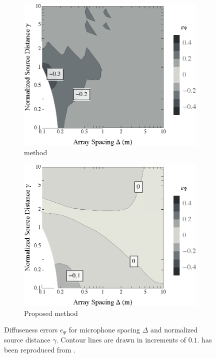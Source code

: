 \begin{figure}[t]
	\centering
	\begin{subfigure}[b]{0.49\textwidth}
		\includegraphics[width=\textwidth]{09_thiergart_comparison/figures/merimaa2005_d_contour_thiergart.eps}
		\caption{\citet{Thiergart2013} method}
		\label{fig:09_Thiergart_Comparison:Diffuseness_Errors:Thiergart}
	\end{subfigure}
	\hfill
	\begin{subfigure}[b]{0.49\textwidth}
		\includegraphics[width=\textwidth]{08_proposed_method/figures/merimaa2005_d_contour_validhybrid.eps}
		\caption{Proposed method}
		\label{fig:09_Thiergart_Comparison:Diffuseness_Errors:Hybrid}
	\end{subfigure}
	
	\caption[Contour plots of diffuseness errors for each interpolation method.]{
	Diffuseness errors $e_\Psi$ for microphone spacing $\Delta$ and normalized source distance $\gamma$.
  Contour lines are drawn in increments of $0.1$.
   has been reproduced from .}
	\label{fig:09_Thiergart_Comparison:Diffuseness_Errors}
\end{figure}

